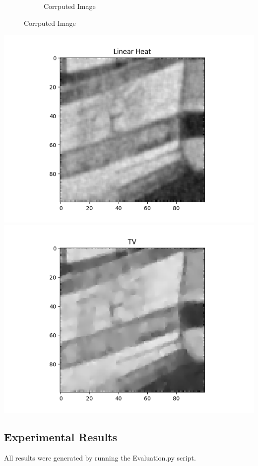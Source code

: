 \documentclass{article}
\begin{document}
\begin{figure}[!htb]
\begin{center}
\begin{subfigure}[b]{0.4\textwidth}
        \caption{Corrputed Image}
      \end{subfigure}
    \end{center}
  \end{figure}

  \newpage
  \begin{center}
    \includegraphics[width=\textwidth]{../generated_images/LinearHeat_test1.png}
    \includegraphics[width=\textwidth]{../generated_images/TV_test1.png}
  \end{center}

  \newpage
  \subsection{Experimental Results}
  All results were generated by running the Evaluation.py script.\\
\end{document}

